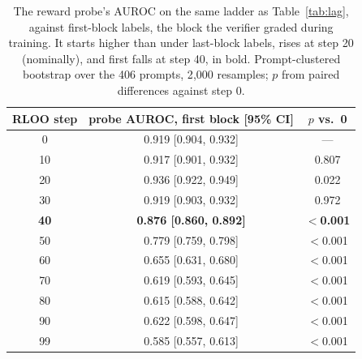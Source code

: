 \documentclass{article}
\begin{document}
\begin{table}[t]
\centering
\footnotesize
\setlength{\tabcolsep}{4pt}
\renewcommand{\arraystretch}{0.92}
\begin{tabular}{ccc}
\toprule
RLOO step & \textbf{probe AUROC, first block} [95\% CI] & $p$ vs.\ 0 \\
\midrule
0 & 0.919 [0.904, 0.932] & --- \\
10 & 0.917 [0.901, 0.932] & 0.807 \\
20 & 0.936 [0.922, 0.949] & 0.022 \\
30 & 0.919 [0.903, 0.932] & 0.972 \\
\textbf{40} & \textbf{0.876 [0.860, 0.892]} & \textbf{$<$0.001} \\
50 & 0.779 [0.759, 0.798] & $<$0.001 \\
60 & 0.655 [0.631, 0.680] & $<$0.001 \\
70 & 0.619 [0.593, 0.645] & $<$0.001 \\
80 & 0.615 [0.588, 0.642] & $<$0.001 \\
90 & 0.622 [0.598, 0.647] & $<$0.001 \\
99 & 0.585 [0.557, 0.613] & $<$0.001 \\
\bottomrule
\end{tabular}
\caption{The reward probe's AUROC on the same ladder as Table~\ref{tab:lag}, against first-block labels, the block the verifier graded during training. It starts higher than under last-block labels, rises at step 20 (nominally), and first falls at step 40, in bold. Prompt-clustered bootstrap over the 406 prompts, 2{,}000 resamples; $p$ from paired differences against step 0.}
\label{tab:lagfirst}
\end{table}
\end{document}
